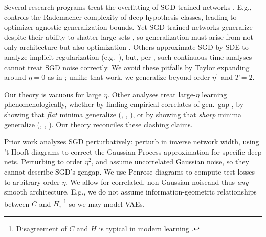 \documentclass{article}
\theoremstyle{plain}
\theoremstyle{definition}
\begin{document}
    Several research programs treat the overfitting of SGD-trained networks
    \citep{ne17a}.  E.g., \cite{ba17} controls the Rademacher complexity of
    deep hypothesis classes, leading to optimizer-agnostic generalization
    bounds.  Yet SGD-trained networks generalize despite their ability to
    shatter large sets \citep{zh17}, so generalization must arise from not only
    architecture but also optimization \citep{ne17b}.  Others approximate
    SGD by SDE to analyze implicit regularization (e.g.\ \cite{ch18}), but,
    per \cite{ya19a}, such continuous-time analyses cannot treat SGD noise
    correctly.
    We avoid these pitfalls by Taylor expanding around $\eta=0$ as in
    \cite{ro18}; unlike that work, we generalize beyond order $\eta^1$ and
    $T=2$.
    

    Our theory is vacuous for large $\eta$.  Other analyses treat
    large-$\eta$ learning phenomenologically, whether by finding empirical
    correlates of gen.\ gap \citep{li18}, by showing that \emph{flat} minima
    generalize (\cite{ho17}, \cite{ke17}, \cite{wa18}), or by showing that
    \emph{sharp} minima generalize (\cite{st56}, \cite{di17}, \cite{wu18}).
    Our theory reconciles these clashing claims.
    

    Prior work analyzes SGD perturbatively: \cite{dy19} perturb in inverse
    network width, using 't Hooft diagrams to correct the Gaussian Process
    approximation for specific deep nets.  Perturbing to order $\eta^2$,
    \cite{ch18} and \cite{li17} assume uncorrelated Gaussian noise, so they
    cannot describe SGD's gen\. gap.  We use Penrose diagrams to compute test
    losses to arbitrary order $\eta$.  We allow for correlated, non-Gaussian
    noiseand thus \emph{any} smooth architecture.  E.g., we do not assume
    information-geometric relationships between $C$ and
    $H$,
    \footnote{
        Disagreement of $C$ and $H$ is typical in modern learning \citep{ro12,
        ku19}.
    }
    so we may model VAEs. 
\end{document}
